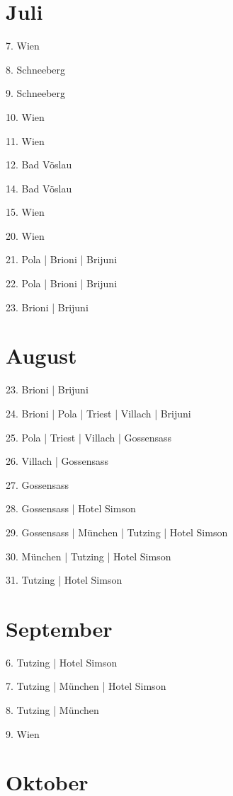 \documentclass[twoside=false,titlepage=false,open=any, parskip=never, fontsize=10pt, headings=small, chapterprefix=false, appendixprefix=false, DIV=15]{scrbook}
\begin{document}
\begin{multicols}{3}
            \section*{Juli}
            7. Wien\par
            8. Schneeberg\par
            9. Schneeberg\par
            10. Wien\par
            11. Wien\par
            12. Bad Vöslau\par
            14. Bad Vöslau\par
            15. Wien\par
            20. Wien\par
            21. Pola | Brioni | Brijuni\par
            22. Pola | Brioni | Brijuni\par
            23. Brioni | Brijuni\par
            \section*{August}
            23. Brioni | Brijuni\par
            24. Brioni | Pola | Triest | Villach | Brijuni\par
            25. Pola | Triest | Villach | Gossensass\par
            26. Villach | Gossensass\par
            27. Gossensass\par
            28. Gossensass | Hotel Simson\par
            29. Gossensass | München | Tutzing | Hotel Simson\par
            30. München | Tutzing | Hotel Simson\par
            31. Tutzing | Hotel Simson\par
            \section*{September}
            6. Tutzing | Hotel Simson\par
            7. Tutzing | München | Hotel Simson\par
            8. Tutzing | München\par
            9. Wien\par
            \section*{Oktober}

\end{multicols}
\end{document}
